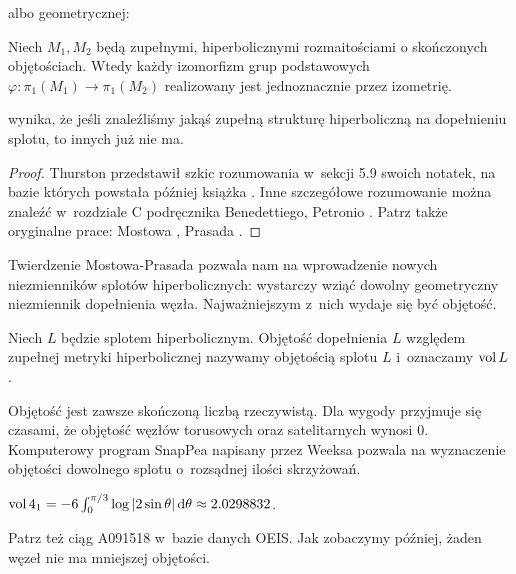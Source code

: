 albo geometrycznej:

\begin{theorem}
    Niech $M_1, M_2$ będą zupełnymi, hiperbolicznymi rozmaitościami o skończonych objętościach.
    Wtedy każdy izomorfizm grup podstawowych $\varphi \colon \pi_1(M_1) \to \pi_1(M_2)$ realizowany jest jednoznacznie przez izometrię.
\end{theorem}

wynika, że jeśli znaleźliśmy jakąś zupełną strukturę hiperboliczną na dopełnieniu splotu, to innych już nie ma.

\begin{proof}
%
%
%
%
%
    Thurston przedstawił szkic rozumowania w~sekcji 5.9 swoich notatek, na bazie których powstała później książka \cite{thurston97}.
    Inne szczegółowe rozumowanie można znaleźć w~rozdziale C podręcznika Benedettiego, Petronio \cite{benedetti92}.
    Patrz także oryginalne prace: Mostowa \cite{mostow73}, Prasada \cite{prasad73}.
\end{proof}

Twierdzenie Mostowa-Prasada pozwala nam na wprowadzenie nowych niezmienników splotów hiperbolicznych: wystarczy wziąć dowolny geometryczny niezmiennik dopełnienia węzła.
Najważniejszym z~nich wydaje się być objętość.

\begin{definition}[objętość]
    Niech $L$ będzie splotem hiperbolicznym.
    Objętość dopełnienia $L$ względem zupełnej metryki hiperbolicznej nazywamy objętością splotu $L$ i~oznaczamy $\operatorname{vol} L$.
\end{definition}

Objętość jest zawsze skończoną liczbą rzeczywistą.
Dla wygody przyjmuje się czasami, że objętość węzłów torusowych oraz satelitarnych wynosi $0$.
Komputerowy program SnapPea napisany przez Weeksa pozwala na wyznaczenie objętości dowolnego splotu o~rozsądnej ilości skrzyżowań.

\begin{example}
    $\operatorname{vol} 4_1 = -6 \int_{0}^{\pi/3} \log |2\sin \theta| \,\mathrm{d}\theta \approx 2.0298832$.
\end{example}

Patrz też ciąg A091518 w~bazie danych OEIS.
Jak zobaczymy później, żaden węzeł nie ma mniejszej objętości.

